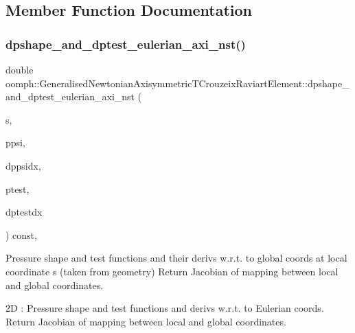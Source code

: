 \subsection{Member Function Documentation}
\mbox{\label{classoomph_1_1GeneralisedNewtonianAxisymmetricTCrouzeixRaviartElement_ade040ee5308d3d7eef9f8099023bec0d}} 
\subsubsection{\texorpdfstring{dpshape\+\_\+and\+\_\+dptest\+\_\+eulerian\+\_\+axi\+\_\+nst()}{dpshape\_and\_dptest\_eulerian\_axi\_nst()}}
{\footnotesize\ttfamily double oomph\+::\+Generalised\+Newtonian\+Axisymmetric\+T\+Crouzeix\+Raviart\+Element\+::dpshape\+\_\+and\+\_\+dptest\+\_\+eulerian\+\_\+axi\+\_\+nst (\begin{DoxyParamCaption}\item[{const \hyperlink{classoomph_1_1Vector}{Vector}$<$ double $>$ \&}]{s,  }\item[{\hyperlink{classoomph_1_1Shape}{Shape} \&}]{ppsi,  }\item[{\hyperlink{classoomph_1_1DShape}{D\+Shape} \&}]{dppsidx,  }\item[{\hyperlink{classoomph_1_1Shape}{Shape} \&}]{ptest,  }\item[{\hyperlink{classoomph_1_1DShape}{D\+Shape} \&}]{dptestdx }\end{DoxyParamCaption}) const\hspace{0.3cm}{\ttfamily [inline]}, {\ttfamily [protected]}}



Pressure shape and test functions and their derivs w.\+r.\+t. to global coords at local coordinate s (taken from geometry) Return Jacobian of mapping between local and global coordinates. 

2D \+: Pressure shape and test functions and derivs w.\+r.\+t. to Eulerian coords. Return Jacobian of mapping between local and global coordinates. 

